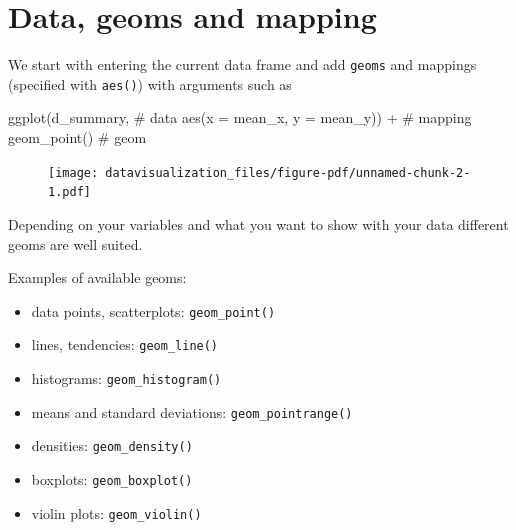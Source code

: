 \documentclass[
  letterpaper,
  DIV=11,
  numbers=noendperiod,
  oneside]{scrreprt}
\newenvironment{Shaded}{\begin{snugshade}}{\end{snugshade}}
\newcommand{\AttributeTok}[1]{\textcolor[rgb]{0.40,0.45,0.13}{#1}}
\newcommand{\CommentTok}[1]{\textcolor[rgb]{0.37,0.37,0.37}{#1}}
\newcommand{\FunctionTok}[1]{\textcolor[rgb]{0.28,0.35,0.67}{#1}}
\newcommand{\NormalTok}[1]{\textcolor[rgb]{0.00,0.23,0.31}{#1}}
\newcommand{\SpecialCharTok}[1]{\textcolor[rgb]{0.37,0.37,0.37}{#1}}
\providecommand{\tightlist}{%
  \setlength{\itemsep}{0pt}\setlength{\parskip}{0pt}}\usepackage{longtable,booktabs,array}
\begin{document}
\hypertarget{data-geoms-and-mapping}{%
\section{Data, geoms and mapping}\label{data-geoms-and-mapping}}

We start with entering the current data frame and add \texttt{geoms} and
mappings (specified with \texttt{aes()}) with arguments such as

\begin{Shaded}
\begin{Highlighting}[]
\FunctionTok{ggplot}\NormalTok{(d\_summary, }\CommentTok{\# data}
       \FunctionTok{aes}\NormalTok{(}\AttributeTok{x =}\NormalTok{ mean\_x, }\AttributeTok{y =}\NormalTok{ mean\_y)) }\SpecialCharTok{+} \CommentTok{\# mapping}
    \FunctionTok{geom\_point}\NormalTok{() }\CommentTok{\# geom }
\end{Highlighting}
\end{Shaded}

\begin{figure}[H]

{\centering \texttt{[image: datavisualization\_files/figure-pdf/unnamed-chunk-2-1.pdf]}

}

\end{figure}

Depending on your variables and what you want to show with your data
different geoms are well suited.

Examples of available geoms:

\begin{itemize}
\tightlist
\item
  data points, scatterplots: \texttt{geom\_point()}
\item
  lines, tendencies: \texttt{geom\_line()}
\item
  histograms: \texttt{geom\_histogram()}
\item
  means and standard deviations: \texttt{geom\_pointrange()}
\item
  densities: \texttt{geom\_density()}
\item
  boxplots: \texttt{geom\_boxplot()}
\item
  violin plots: \texttt{geom\_violin()}
\end{itemize}

\end{document}
